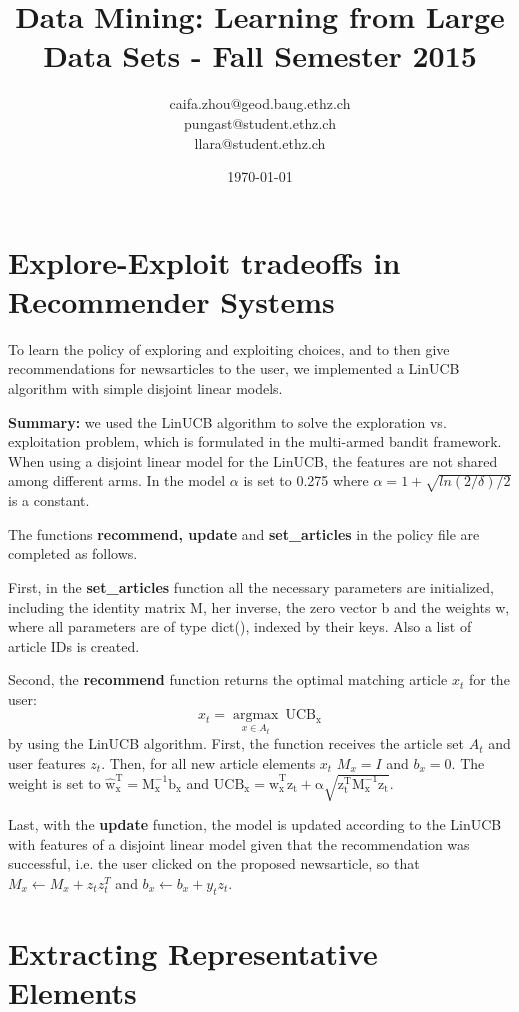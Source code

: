 \documentclass[a4paper, 11pt]{article}
\title{Data Mining: Learning from Large Data Sets - Fall Semester 2015}
\author{caifa.zhou@geod.baug.ethz.ch\\ pungast@student.ethz.ch\\ llara@student.ethz.ch\\}
\date{\today}
\begin{document}
\maketitle

\section*{Explore-Exploit tradeoffs in Recommender Systems} 

To learn the policy of exploring and exploiting choices, and to then give recommendations for newsarticles to the user, we implemented a LinUCB algorithm with simple disjoint linear models.

\textbf{Summary:} we used the LinUCB algorithm to solve the exploration vs. exploitation problem, which is formulated in the multi-armed bandit framework. When using a disjoint linear model for the LinUCB, the features are not shared among different arms. In the model $\alpha$ is set to 0.275 where $\alpha = 1 + \sqrt{ln(2/\delta)/2}$ is a constant.

The functions \textbf{recommend, update} and \textbf{set\_articles} in the policy file are completed as follows.  

First, in the \textbf{set\_articles} function all the necessary parameters are initialized, including the identity matrix M, her inverse, the zero vector b and the weights w, where all parameters are of type dict(), indexed by their keys. Also a list of article IDs is created.

Second, the \textbf{recommend} function returns the optimal matching article $x_{t}$ for the user: 
$$x_{t} = \underset{x\in A_{t}}{\operatorname{argmax}}~\mathrm{UCB_{x}}$$ by using the LinUCB algorithm. First, the function receives the article set $A_{t}$ and user features $z_{t}$. Then, for all new article elements $x_{t}$ $M_{x} = I$ and $b_{x} =0$. The weight is set to $\mathrm{\hat{w}_{x}^{T} = M_{x}^{-1}b_{x}}$ and $\mathrm{UCB_{x}} = \mathrm{\hat{w}_{x}^{T}z_{t} + \alpha \sqrt{z_{t}^{T}M_{x}^{-1}z_{t}}}$.

Last, with the \textbf{update} function, the model is updated according to the LinUCB with features of a disjoint linear model given that the recommendation was successful, i.e. the user clicked on the proposed newsarticle, so that $M_{x} \leftarrow M_{x} +z_{t} z^{T}_{t}$ and $b_{x} \leftarrow b_{x} + y_{t}z_{t}$. 
\pagebreak

\section*{Extracting Representative Elements} 
\end{document}
